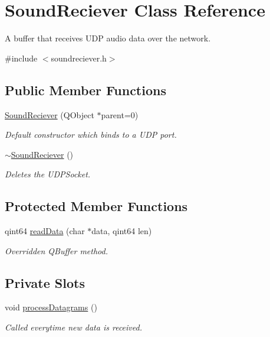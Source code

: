 \hypertarget{class_sound_reciever}{
\section{\-Sound\-Reciever \-Class \-Reference}
\label{class_sound_reciever}
}


\-A buffer that receives \-U\-D\-P audio data over the network.  




{\ttfamily \#include $<$soundreciever.\-h$>$}

\subsection*{\-Public \-Member \-Functions}
\begin{DoxyCompactItemize}
\item 
\hyperlink{class_sound_reciever_ad10126bf26dd00c6a48d763c9691e0ca}{\-Sound\-Reciever} (\-Q\-Object $\ast$parent=0)
\begin{DoxyCompactList}\small\item\em \-Default constructor which binds to a \-U\-D\-P port. \end{DoxyCompactList}\item 
\hyperlink{class_sound_reciever_ae7e8a754e275fedf25e4cc8f86f64d72}{$\sim$\-Sound\-Reciever} ()
\begin{DoxyCompactList}\small\item\em \-Deletes the \-U\-D\-P\-Socket. \end{DoxyCompactList}\end{DoxyCompactItemize}
\subsection*{\-Protected \-Member \-Functions}
\begin{DoxyCompactItemize}
\item 
qint64 \hyperlink{class_sound_reciever_ad2e6e099486057cce325d4775c499eb9}{read\-Data} (char $\ast$data, qint64 len)
\begin{DoxyCompactList}\small\item\em \-Overridden \-Q\-Buffer method. \end{DoxyCompactList}\end{DoxyCompactItemize}
\subsection*{\-Private \-Slots}
\begin{DoxyCompactItemize}
\item 
void \hyperlink{class_sound_reciever_a4c771b264d77cc76ce759c797e1971fd}{process\-Datagrams} ()
\begin{DoxyCompactList}\small\item\em \-Called everytime new data is received. \end{DoxyCompactList}\end{DoxyCompactItemize}
